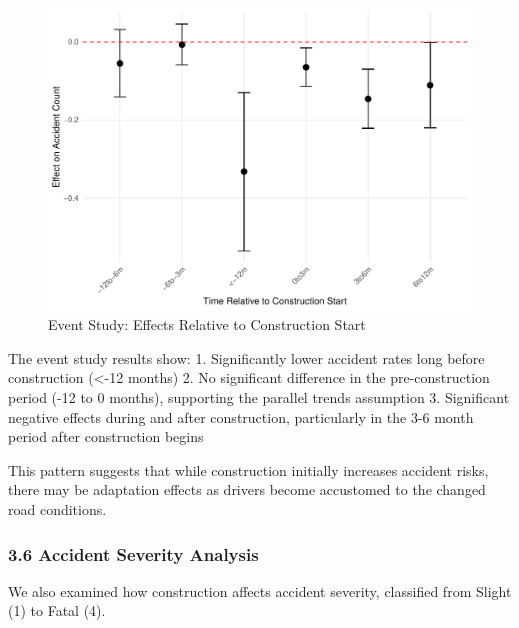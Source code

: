 \documentclass[
]{article}
\begin{document}
\begin{figure}

{\centering \includegraphics[width=1\linewidth]{test_files/figure-latex/event_study_figure-1} 

}

\caption{Event Study: Effects Relative to Construction Start}\label{fig:event_study_figure}
\end{figure}

The event study results show: 1. Significantly lower accident rates long
before construction (\textless-12 months) 2. No significant difference
in the pre-construction period (-12 to 0 months), supporting the
parallel trends assumption 3. Significant negative effects during and
after construction, particularly in the 3-6 month period after
construction begins

This pattern suggests that while construction initially increases
accident risks, there may be adaptation effects as drivers become
accustomed to the changed road conditions.

\subsubsection{3.6 Accident Severity
Analysis}\label{accident-severity-analysis}

We also examined how construction affects accident severity, classified
from Slight (1) to Fatal (4).
\end{document}
